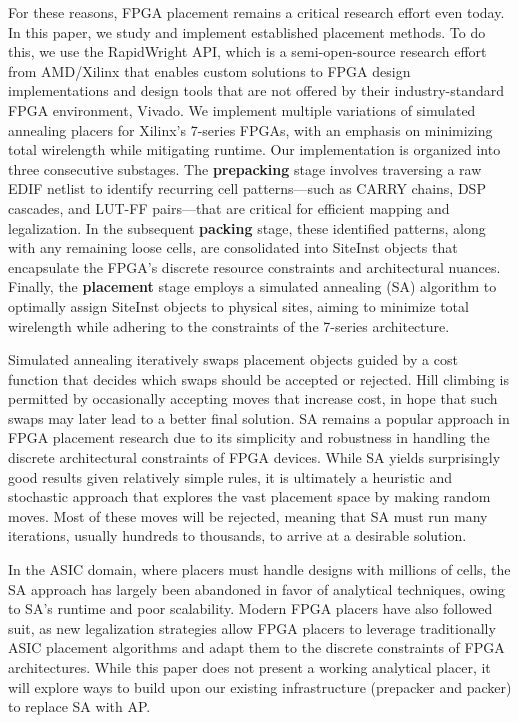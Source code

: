 \documentclass[twocolumn]{article}
\begin{document}
    For these reasons, FPGA placement remains a critical research effort even today. 
    In this paper, we study and implement established placement methods. 
    To do this, we use the RapidWright API, which is a semi-open-source research effort from AMD/Xilinx that enables custom solutions to FPGA design implementations and design tools that are not offered by their industry-standard FPGA environment, Vivado. 
    We implement multiple variations of simulated annealing placers for Xilinx's 7-series FPGAs, with an emphasis on minimizing total wirelength while mitigating runtime. 
    Our implementation is organized into three consecutive substages. 
    The \textbf{prepacking} stage involves traversing a raw EDIF netlist to identify recurring cell patterns—such as CARRY chains, DSP cascades, and LUT-FF pairs—that are critical for efficient mapping and legalization. 
    In the subsequent \textbf{packing} stage, these identified patterns, along with any remaining loose cells, are consolidated into SiteInst objects that encapsulate the FPGA’s discrete resource constraints and architectural nuances. 
    Finally, the \textbf{placement} stage employs a simulated annealing (SA) algorithm to optimally assign SiteInst objects to physical sites, aiming to minimize total wirelength while adhering to the constraints of the 7-series architecture. 

    Simulated annealing iteratively swaps placement objects guided by a cost function that decides which swaps should be accepted or rejected. 
    Hill climbing is permitted by occasionally accepting moves that increase cost, in hope that such swaps may later lead to a better final solution. 
    SA remains a popular approach in FPGA placement research due to its simplicity and robustness in handling the discrete architectural constraints of FPGA devices. 
    While SA yields surprisingly good results given relatively simple rules, it is ultimately a heuristic and stochastic approach that explores the vast placement space by making random moves. 
    Most of these moves will be rejected, meaning that SA must run many iterations, usually hundreds to thousands, to arrive at a desirable solution. 

    In the ASIC domain, where placers must handle designs with millions of cells, the SA approach has largely been abandoned in favor of analytical techniques, owing to SA's runtime and poor scalability. 
    Modern FPGA placers have also followed suit, as new legalization strategies allow FPGA placers to leverage traditionally ASIC placement algorithms and adapt them to the discrete constraints of FPGA architectures. 
    While this paper does not present a working analytical placer, it will explore ways to build upon our existing infrastructure (prepacker and packer) to replace SA with AP. 
\end{document}
